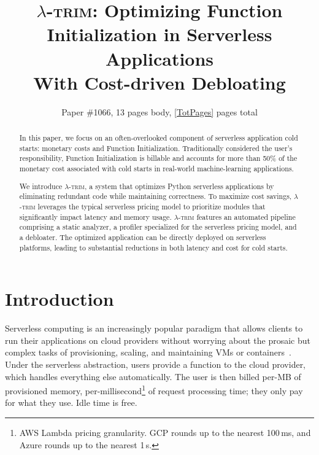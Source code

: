 \documentclass[sigplan,nonacm]{acmart}
\newcommand{\sys}{\textsc{\ensuremath{\lambda}-trim}\xspace}
\begin{document}
\date{}



\title{\LARGE \bf \texorpdfstring{\boldmath}{}\sys: Optimizing Function Initialization in Serverless Applications\texorpdfstring{\\}{ }With Cost-driven Debloating}

\author{Paper \#1066, 13 pages body, \ref{TotPages} pages total}
\date{}



\iffalse
\newcommand{\review}[1]{}
\else
\newcommand{\review}[1]{\todo[author=reviewer,color=green!20,inline]{#1}}
\fi


\begin{abstract}



In this paper, we focus on an often-overlooked component of serverless application cold starts: monetary costs and Function Initialization.
Traditionally considered the user's responsibility, Function Initialization is billable and accounts for more than 50\% of the monetary cost associated with cold starts in real-world machine-learning applications.


We introduce \sys, a system that optimizes Python serverless applications by eliminating redundant code while maintaining correctness.
To maximize cost savings, \sys leverages the typical serverless pricing model to prioritize modules that significantly impact latency and memory usage.
\sys features an automated pipeline comprising a static analyzer, a profiler specialized for the serverless pricing model, and a debloater.
The optimized application can be directly deployed on serverless platforms, leading to substantial reductions in both latency and cost for cold starts.


 
\end{abstract}



\maketitle
\pagestyle{plain}


\section{Introduction}


Serverless computing is an increasingly popular paradigm that allows clients to run their applications on cloud providers without worrying about the prosaic but complex tasks of provisioning, scaling, and maintaining VMs or containers~\cite{Jonas:EECS-2019-3}.
Under the serverless abstraction, users provide a function to the cloud provider, which handles everything else automatically.
The user is then billed per-MB of provisioned memory, per-millisecond\footnote{AWS Lambda pricing granularity. GCP rounds up to the nearest 100\,ms, and Azure rounds up to the nearest 1\,s.} of request processing time;
they only pay for what they use.
Idle time is free.
\end{document}
